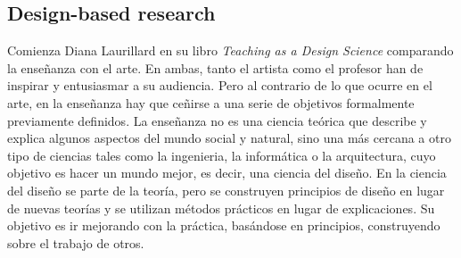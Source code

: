 


\subsection{Design-based research}

Comienza Diana Laurillard en su libro \emph{Teaching as a Design Science} comparando la enseñanza con el arte. En ambas, tanto el artista como el profesor han de inspirar y entusiasmar a su audiencia. Pero al contrario de lo que ocurre en el arte, en la enseñanza hay que ceñirse a una serie de objetivos formalmente previamente definidos. La enseñanza no es una ciencia teórica que describe y explica algunos aspectos del mundo social y natural, sino una más cercana a otro tipo de ciencias tales como la ingenieria, la informática o la arquitectura, cuyo objetivo es hacer un mundo mejor, es decir, una ciencia del diseño. En la ciencia del diseño se parte de la teoría, pero se construyen principios de diseño en lugar de nuevas teorías y se utilizan métodos prácticos en lugar de explicaciones. Su objetivo es ir mejorando con la práctica, basándose en principios, construyendo sobre el trabajo de otros.

